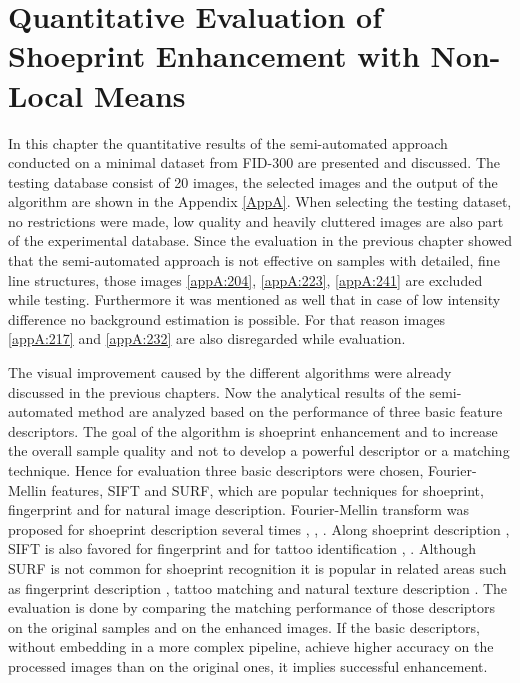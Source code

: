 \documentclass[draft,final]{vutinfth} %
\begin{document}
\section{Quantitative Evaluation of Shoeprint Enhancement with Non-Local Means}
\par
In this chapter the quantitative results of the semi-automated approach conducted on a minimal dataset from FID-300 are presented and discussed.
The testing database consist of 20 images, the selected images and the output of the algorithm are shown in the Appendix \ref{AppA}.
When selecting the testing dataset, no restrictions were made, low quality and heavily cluttered images are also part of the experimental database.
Since the evaluation in the previous chapter showed that the semi-automated approach is not effective on samples with detailed, fine line structures, those images \ref{appA:204}, \ref{appA:223}, \ref{appA:241} are excluded while testing.
Furthermore it was mentioned as well that in case of low intensity difference no background estimation is possible. For that reason images \ref{appA:217} and \ref{appA:232} are also disregarded while evaluation.
\par
The visual improvement caused by the different algorithms were already discussed in the previous chapters.
Now the analytical results of the semi-automated method are analyzed based on the performance of three basic feature descriptors.
The goal of the algorithm is shoeprint enhancement and to increase the overall sample quality and not to develop a powerful descriptor or a matching technique.
Hence for evaluation three basic descriptors were chosen, Fourier-Mellin features, SIFT and SURF, which are popular techniques for shoeprint, fingerprint and for natural image description.
Fourier-Mellin transform was proposed for shoeprint description several times \cite{gueham2008automatic}, \cite{richetelli2017classification}, \cite{wu2019crime}.
Along shoeprint description \cite{nibouche2009rotation}, \cite{richetelli2017classification} SIFT is also favored for fingerprint \cite{zhou2011adaptive} and for tattoo identification \cite{yi2015impact}, \cite{han2013tattoo}.
Although SURF is not common for shoeprint recognition it is popular in related areas such as fingerprint description \cite{jahan2017robust}, tattoo matching \cite{yi2015impact} and natural texture description \cite{prabhakar2012lbp}.
The evaluation is done by comparing the matching performance of those descriptors on the original samples and on the enhanced images.
If the basic descriptors, without embedding in a more complex pipeline, achieve higher accuracy on the processed  images than on the original ones, it implies successful enhancement.
\end{document}
